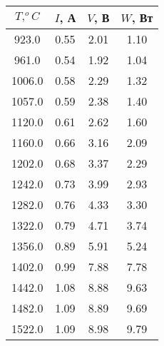 \begin{tabular}{cccc}
\toprule
$T, ^oC$ & $I$, А & $V$, В & $W$, Вт \\
\midrule
923.0 & 0.55 & 2.01 & 1.10 \\
961.0 & 0.54 & 1.92 & 1.04 \\
1006.0 & 0.58 & 2.29 & 1.32 \\
1057.0 & 0.59 & 2.38 & 1.40 \\
1120.0 & 0.61 & 2.62 & 1.60 \\
1160.0 & 0.66 & 3.16 & 2.09 \\
1202.0 & 0.68 & 3.37 & 2.29 \\
1242.0 & 0.73 & 3.99 & 2.93 \\
1282.0 & 0.76 & 4.33 & 3.30 \\
1322.0 & 0.79 & 4.71 & 3.74 \\
1356.0 & 0.89 & 5.91 & 5.24 \\
1402.0 & 0.99 & 7.88 & 7.78 \\
1442.0 & 1.08 & 8.88 & 9.63 \\
1482.0 & 1.09 & 8.89 & 9.69 \\
1522.0 & 1.09 & 8.98 & 9.79 \\
\bottomrule
\end{tabular}
